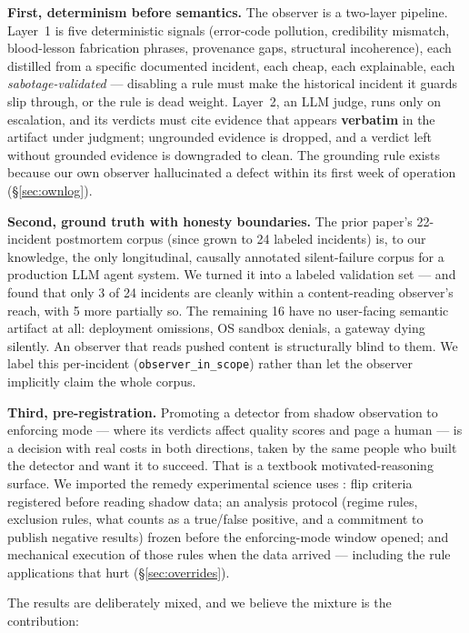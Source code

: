 \documentclass[11pt]{article}
\begin{document}
\textbf{First, determinism before semantics.} The observer is a
two-layer pipeline. Layer~1 is five deterministic signals (error-code
pollution, credibility mismatch, blood-lesson fabrication phrases,
provenance gaps, structural incoherence), each distilled from a specific
documented incident, each cheap, each explainable, each
\emph{sabotage-validated} --- disabling a rule must make the historical
incident it guards slip through, or the rule is dead weight. Layer~2, an
LLM judge, runs only on escalation, and its verdicts must cite evidence
that appears \textbf{verbatim} in the artifact under judgment;
ungrounded evidence is dropped, and a verdict left without grounded
evidence is downgraded to clean. The grounding rule exists because our
own observer hallucinated a defect within its first week of operation
(\S\ref{sec:ownlog}).

\textbf{Second, ground truth with honesty boundaries.} The prior
paper's 22-incident postmortem corpus (since grown to 24 labeled
incidents) is, to our knowledge, the only longitudinal, causally
annotated silent-failure corpus for a production LLM agent system. We
turned it into a labeled validation set --- and found that only 3 of 24
incidents are cleanly within a content-reading observer's reach, with 5
more partially so. The remaining 16 have no user-facing semantic
artifact at all: deployment omissions, OS sandbox denials, a gateway
dying silently. An observer that reads pushed content is structurally
blind to them. We label this per-incident (\texttt{observer\_in\_scope})
rather than let the observer implicitly claim the whole corpus.

\textbf{Third, pre-registration.} Promoting a detector from shadow
observation to enforcing mode --- where its verdicts affect quality
scores and page a human --- is a decision with real costs in both
directions, taken by the same people who built the detector and want it
to succeed. That is a textbook motivated-reasoning surface. We imported
the remedy experimental science uses \cite{nosek2018prereg}: flip
criteria registered before reading shadow data; an analysis protocol
(regime rules, exclusion rules, what counts as a true/false positive,
and a commitment to publish negative results) frozen before the
enforcing-mode window opened; and mechanical execution of those rules
when the data arrived --- including the rule applications that hurt
(\S\ref{sec:overrides}).

The results are deliberately mixed, and we believe the mixture is the
contribution:
\end{document}
